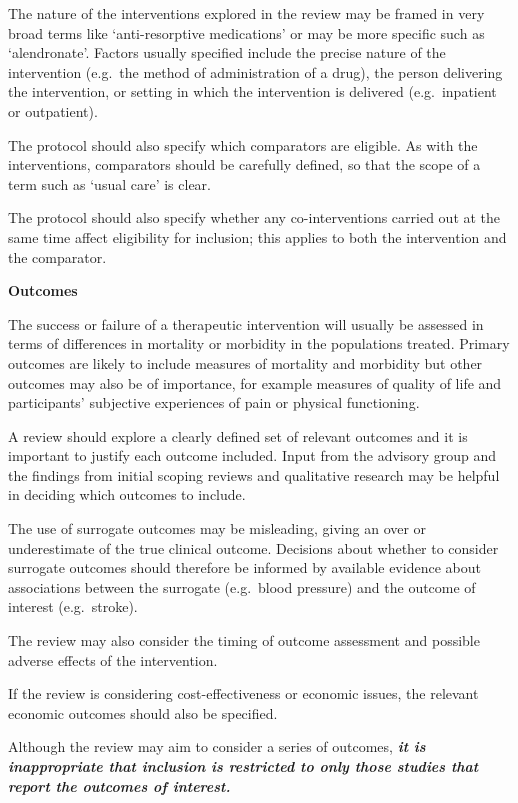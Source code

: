 \documentclass[
  11pt,
  a4paper,
  DIV=11,
  numbers=noendperiod]{scrreprt}
\begin{document}
The nature of the interventions explored in the review may be framed in
very broad terms like `anti-resorptive medications' or may be more
specific such as `alendronate'. Factors usually specified include the
precise nature of the intervention (e.g.~the method of administration of
a drug), the person delivering the intervention, or setting in which the
intervention is delivered (e.g.~inpatient or outpatient).

The protocol should also specify which comparators are eligible. As with
the interventions, comparators should be carefully defined, so that the
scope of a term such as `usual care' is clear.

The protocol should also specify whether any co-interventions carried
out at the same time affect eligibility for inclusion; this applies to
both the intervention and the comparator.

\textbf{Outcomes}

The success or failure of a therapeutic intervention will usually be
assessed in terms of differences in mortality or morbidity in the
populations treated. Primary outcomes are likely to include measures of
mortality and morbidity but other outcomes may also be of importance,
for example measures of quality of life and participants' subjective
experiences of pain or physical functioning.

A review should explore a clearly defined set of relevant outcomes and
it is important to justify each outcome included. Input from the
advisory group and the findings from initial scoping reviews and
qualitative research may be helpful in deciding which outcomes to
include.

The use of surrogate outcomes may be misleading, giving an over or
underestimate of the true clinical outcome. Decisions about whether to
consider surrogate outcomes should therefore be informed by available
evidence about associations between the surrogate (e.g.~blood pressure)
and the outcome of interest (e.g.~stroke).

The review may also consider the timing of outcome assessment and
possible adverse effects of the intervention.

If the review is considering cost-effectiveness or economic issues, the
relevant economic outcomes should also be specified.

Although the review may aim to consider a series of outcomes,
\textbf{\emph{it is inappropriate that inclusion is restricted to only
those studies that report the outcomes of interest.}}
\end{document}
